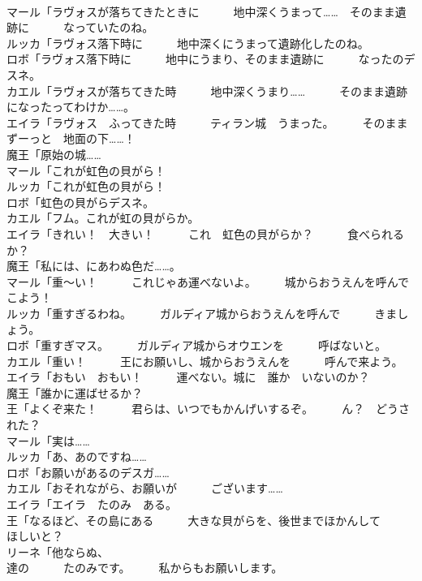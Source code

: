 \documentclass[8pt]{extreport}
\begin{document}
\begin{CJK}{UTF8}{min}
\\	マール「ラヴォスが落ちてきたときに　　　地中深くうまって……　そのまま遺跡に　　　なっていたのね。	
\\	ルッカ「ラヴォス落下時に　　　地中深くにうまって遺跡化したのね。	
\\	ロボ「ラヴォス落下時に　　　地中にうまり、そのまま遺跡に　　　なったのデスネ。	
\\	カエル「ラヴォスが落ちてきた時　　　地中深くうまり……　　　そのまま遺跡になったってわけか……。	
\\	エイラ「ラヴォス　ふってきた時　　　ティラン城　うまった。　　　そのまま　ずーっと　地面の下……！	
\\	魔王「原始の城……	
\\	マール「これが虹色の貝がら！	
\\	ルッカ「これが虹色の貝がら！	
\\	ロボ「虹色の貝がらデスネ。	
\\	カエル「フム。これが虹の貝がらか。	
\\	エイラ「きれい！　大きい！　　　これ　虹色の貝がらか？　　　食べられるか？	
\\	魔王「私には、にあわぬ色だ……。	
\\	マール「重～い！　　　これじゃあ運べないよ。　　　城からおうえんを呼んでこよう！	
\\	ルッカ「重すぎるわね。　　　ガルディア城からおうえんを呼んで　　　きましょう。	
\\	ロボ「重すぎマス。　　　ガルディア城からオウエンを　　　呼ばないと。	
\\	カエル「重い！　　　王にお願いし、城からおうえんを　　　呼んで来よう。	
\\	エイラ「おもい　おもい！　　　運べない。城に　誰か　いないのか？	
\\	魔王「誰かに運ばせるか？	
\\	王「よくぞ来た！　　　君らは、いつでもかんげいするぞ。　　　ん？　どうされた？	
\\	マール「実は……	
\\	ルッカ「あ、あのですね……	
\\	ロボ「お願いがあるのデスガ……	
\\	カエル「おそれながら、お願いが　　　ございます……	
\\	エイラ「エイラ　たのみ　ある。	
\\	王「なるほど、その島にある　　　大きな貝がらを、後世までほかんして　　　ほしいと？	
\\	リーネ「他ならぬ、
\\	達の　　　たのみです。　　　私からもお願いします。	

\end{CJK}
\end{document}
